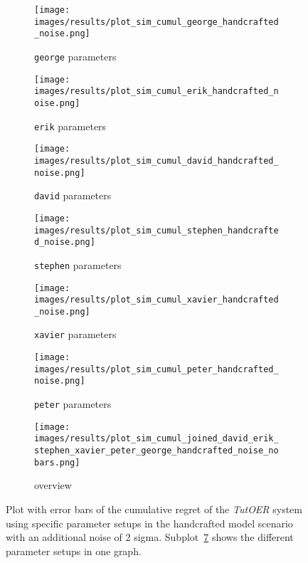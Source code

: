 \begin{figure}[ht]
	\begin{subfigure}{0.48\linewidth}
	\texttt{[image: images/results/plot\_sim\_cumul\_george\_handcrafted\_noise.png]}
	\caption{\texttt{george} parameters}
	\label{fig:cumul_handcrafted_noise_george}
	\end{subfigure}
	\hfill
	\begin{subfigure}{0.48\linewidth}
	\texttt{[image: images/results/plot\_sim\_cumul\_erik\_handcrafted\_noise.png]}
	\caption{\texttt{erik} parameters}
	\label{fig:cumul_handcrafted_noise_erik}
	\end{subfigure}
	\begin{subfigure}{0.48\linewidth}
	\texttt{[image: images/results/plot\_sim\_cumul\_david\_handcrafted\_noise.png]}
	\caption{\texttt{david} parameters}
	\label{fig:cumul_handcrafted_noise_david}
	\end{subfigure}
	\hfill
	\begin{subfigure}{0.48\linewidth}
	\texttt{[image: images/results/plot\_sim\_cumul\_stephen\_handcrafted\_noise.png]}
	\caption{\texttt{stephen} parameters}
	\label{fig:cumul_handcrafted_noise_stephen}
	\end{subfigure}
	\begin{subfigure}{0.48\linewidth}
	\texttt{[image: images/results/plot\_sim\_cumul\_xavier\_handcrafted\_noise.png]}
	\caption{\texttt{xavier} parameters}
	\label{fig:cumul_handcrafted_noise_xavier}
	\end{subfigure}
	\hfill
	\begin{subfigure}{0.48\linewidth}
	\texttt{[image: images/results/plot\_sim\_cumul\_peter\_handcrafted\_noise.png]}
	\caption{\texttt{peter} parameters}
	\label{fig:cumul_handcrafted_noise_peter}
	\end{subfigure}
	\begin{subfigure}{\linewidth}
	\texttt{[image: images/results/plot\_sim\_cumul\_joined\_david\_erik\_stephen\_xavier\_peter\_george\_handcrafted\_noise\_nobars.png]}
	\caption{overview}
	\label{fig:cumul_handcrafted_noise_overview_group1}
	\end{subfigure}
	\caption{Plot with error bars of the cumulative regret of the \emph{TutOER}
	system using specific parameter setups in the handcrafted model scenario
	with an additional noise of 2 sigma.
	Subplot~\ref{fig:cumul_handcrafted_noise_overview_group1} shows the
	different parameter setups in one graph.}
	\label{fig:cumul_handcrafted_noise_container_group1}
\end{figure}

